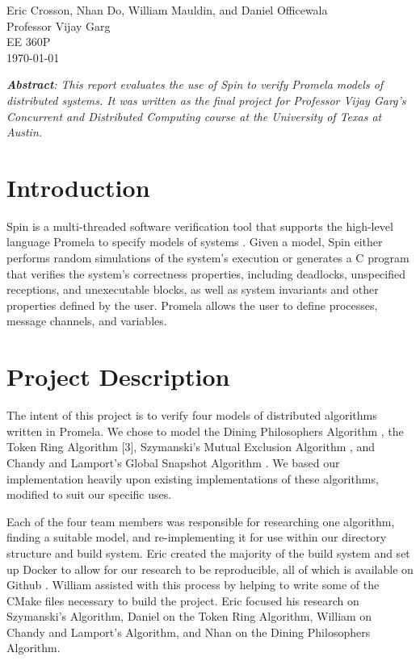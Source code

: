 \documentclass[12pt]{article}
\begin{document}
\begin{flushleft}
Eric Crosson, Nhan Do, William Mauldin, and Daniel Officewala \\
Professor Vijay Garg\\
EE 360P \\
\today \\

\begin{center}
  \emph{\textbf{Abstract}: This report evaluates the use of Spin to verify
    Promela models of distributed systems. It was written as the final project
    for Professor Vijay Garg's Concurrent and Distributed Computing course at
    the University of Texas at Austin.}
\end{center}

\setlength{\parindent}{0.5in}
\section{Introduction}
Spin is a multi-threaded software verification tool that supports the high-level
language Promela to specify models of systems \cite{spinroot}. Given a model, Spin either
performs random simulations of the system's execution or generates a C program
that verifies the system's correctness properties, including deadlocks,
unspecified receptions, and unexecutable blocks, as well as system invariants
and other properties defined by the user. Promela allows the user to define
processes, message channels, and variables.

\section{Project Description}
The intent of this project is to verify four models of distributed algorithms
written in Promela. We chose to model the Dining Philosophers Algorithm
\cite{din:phil}, the Token Ring Algorithm [3], Szymanski's Mutual
Exclusion Algorithm \cite{szymanski:info}, and Chandy and Lamport's Global
Snapshot Algorithm \cite{ch:01}. We based our implementation heavily upon
existing implementations of these algorithms, modified to suit our specific
uses.

Each of the four team members was responsible for researching one algorithm,
finding a suitable model, and re-implementing it for use within our directory
structure and build system. Eric created the majority of the build system and
set up Docker \cite{docker} to allow for our research to be reproducible, all of
which is available on Github \cite{github:camelot}. William assisted with this
process by helping to write some of the CMake files necessary to build the
project. Eric focused his research on Szymanski's Algorithm, Daniel on the Token
Ring Algorithm, William on Chandy and Lamport's Algorithm, and Nhan on the
Dining Philosophers Algorithm.


\end{flushleft}
\end{document}
